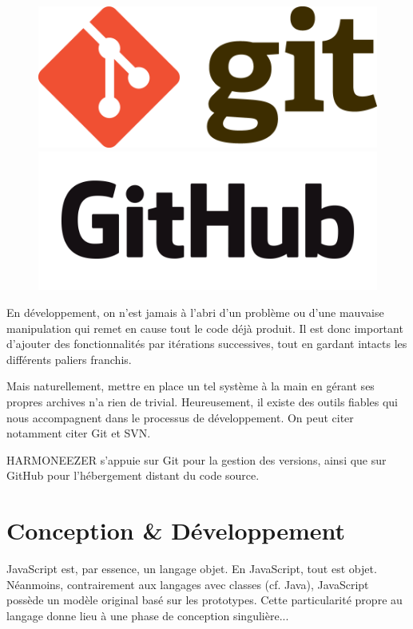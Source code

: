 \documentclass[a4paper,12pt]{article}
\begin{document}
\begin{figure}[!h]
  \begin{center}
    \includegraphics[scale=0.15]{logo-git.png}
    \includegraphics[scale=0.15]{logo-github.png}
  \end{center}
\end{figure}

En développement, on n'est jamais à l'abri d'un problème ou d'une mauvaise manipulation qui remet en cause tout le code déjà produit. Il est donc important d'ajouter des fonctionnalités par itérations successives, tout en gardant intacts les différents paliers franchis.

Mais naturellement, mettre en place un tel système à la main en gérant ses propres archives n'a rien de trivial. Heureusement, il existe des outils fiables qui nous accompagnent dans le processus de développement. On peut citer notamment citer Git et SVN.

HARMONEEZER s'appuie sur Git pour la gestion des versions, ainsi que sur GitHub pour l'hébergement distant du code source.

\section{Conception \& Développement}

JavaScript est, par essence, un langage objet. En JavaScript, tout est objet. Néanmoins, contrairement aux langages avec classes (cf. Java), JavaScript possède un modèle original basé sur les prototypes. Cette particularité propre au langage donne lieu à une phase de conception singulière...
\end{document}
